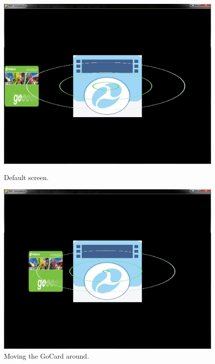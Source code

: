 \documentclass[a4paper]{article}
\begin{document}
\begin{figure}[!ht]
  \centering
  \begin{minipage}[b]{0.40\textwidth}
    \includegraphics[width=\textwidth]{1.jpg}
    \caption{Default screen.}
  \end{minipage}
  \hfill
  \begin{minipage}[b]{0.40\textwidth}
    \includegraphics[width=\textwidth]{2.jpg}
    \caption{Moving the GoCard around.}
  \end{minipage}
\end{figure}
\end{document}
